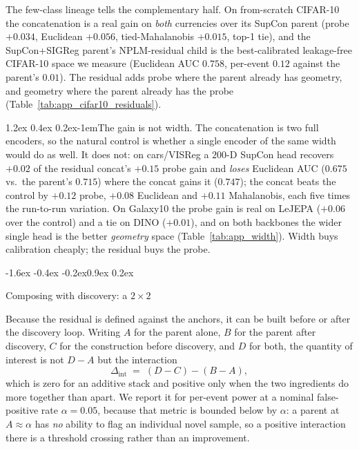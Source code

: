 \documentclass{article}
\makeatletter
\renewcommand\subsection{\@startsection{subsection}{2}{\z@}%
  {-1.6ex \@plus -0.4ex \@minus -0.2ex}{0.9ex \@plus 0.2ex}%
  {\normalsize\bf\raggedright}}
\renewcommand\paragraph{\@startsection{paragraph}{4}{\z@}%
  {1.2ex \@plus 0.4ex \@minus 0.2ex}{-1em}{\normalsize\bf}}
\makeatother
\begin{document}
The few-class lineage tells the complementary half. On from-scratch CIFAR-10
the concatenation is a real gain on \emph{both} currencies over its SupCon
parent (probe $+0.034$, Euclidean $+0.056$, tied-Mahalanobis $+0.015$, top-1
tie), and the SupCon+SIGReg parent's NPLM-residual child is the
best-calibrated leakage-free CIFAR-10 space we measure (Euclidean AUC $0.758$,
per-event $0.12$ against the parent's $0.01$). The residual adds probe where
the parent already has geometry, and geometry where the parent already has
the probe (Table~\ref{tab:app_cifar10_residuals}).

\paragraph{The gain is not width.} The concatenation is two full encoders,
so the natural control is whether a single encoder of the same width would do
as well. It does not: on cars/VISReg a $200$-D SupCon head recovers $+0.02$ of
the residual concat's $+0.15$ probe gain and \emph{loses} Euclidean AUC
($0.675$ vs.\ the parent's $0.715$) where the concat gains it ($0.747$); the
concat beats the control by $+0.12$ probe, $+0.08$ Euclidean and $+0.11$
Mahalanobis, each five times the run-to-run variation. On Galaxy10 the probe gain is
real on LeJEPA ($+0.06$ over the control) and a tie on DINO ($+0.01$), and on
both backbones the wider single head is the better \emph{geometry} space
(Table~\ref{tab:app_width}). Width buys calibration cheaply; the residual
buys the probe.

\subsection{Composing with discovery: a \texorpdfstring{$2\times2$}{2x2}}

Because the residual is defined against the anchors, it can be built before or
after the discovery loop. Writing $A$ for the parent alone, $B$ for the parent
after discovery, $C$ for the construction before discovery, and $D$ for both,
the quantity of interest is not $D - A$ but the interaction
\begin{equation}
  \Delta_{\text{int}} \;=\; (D - C) - (B - A),
  \label{eq:interaction}
\end{equation}
which is zero for an additive stack and positive only when the two
ingredients do more together than apart. We report it for per-event power at a
nominal false-positive rate $\alpha = 0.05$, because that metric is bounded
below by $\alpha$: a parent at $A \approx \alpha$ has \emph{no} ability to
flag an individual novel sample, so a positive interaction there is a
threshold crossing rather than an improvement.
\end{document}
